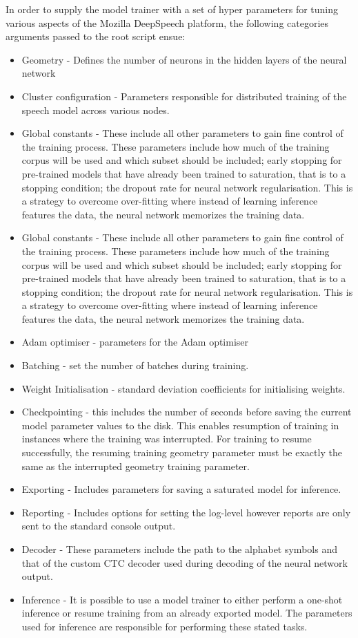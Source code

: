 In order to supply the model trainer with a set of hyper parameters for tuning various aspects of the Mozilla DeepSpeech platform, the following categories arguments passed to the root script ensue:
\begin{itemize}
    \item Geometry - Defines the number of neurons in the hidden layers of the neural network
    \item Cluster configuration - Parameters responsible for distributed training of the speech model across various nodes.
    \item Global constants - These include all other parameters to gain fine control of the training process.  These parameters include how much of the training corpus will be used and which subset should be included; early stopping for pre-trained models that have already been trained to saturation, that is to a stopping condition; the dropout rate for neural network regularisation.  This is a strategy to overcome over-fitting where instead of learning inference features the data, the neural network memorizes the training data.
    \item Global constants - These include all other parameters to gain fine control of the training process.  These parameters include how much of the training corpus will be used and which subset should be included; early stopping for pre-trained models that have already been trained to saturation, that is to a stopping condition; the dropout rate for neural network regularisation.  This is a strategy to overcome over-fitting where instead of learning inference features the data, the neural network memorizes the training data.
    \item Adam optimiser - parameters for the Adam optimiser
    \item Batching - set the number of batches during training.
    \item Weight Initialisation - standard deviation coefficients for initialising weights.
    \item Checkpointing - this includes the number of seconds before saving the current model parameter values to the disk.  This enables resumption of training in instances where the training was interrupted. For training to resume successfully, the resuming training geometry parameter must be exactly the same as the interrupted geometry training parameter.
    \item Exporting - Includes parameters for saving a saturated model for inference.
    \item Reporting - Includes options for setting the log-level however reports are only sent to the standard console output.
    \item Decoder - These parameters include the path to the alphabet symbols and that of the custom CTC decoder used during decoding of the neural network output.
    \item Inference - It is possible to use a model trainer to either perform a one-shot inference or resume training from an already exported model. The parameters used for inference are responsible for performing these stated tasks.
\end{itemize}

